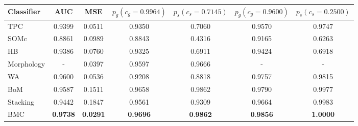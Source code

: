 \begin{tabular}{l c c c c c c}
  Classifier & AUC & MSE &
  $p_{g}\left(c_g=0.9964\right)$ & $p_{s}\left(c_s=0.7145\right)$ &
  $p_{g}\left(c_g=0.9600\right)$ & $p_{s}\left(c_s=0.2500\right)$ \\
  \hline
  TPC        & 0.9399 & 0.0511 & 0.9350 & 0.7060 & 0.9570 & 0.9747 \\
  SOMc       & 0.8861 & 0.0989 & 0.8843 & 0.4316 & 0.9165 & 0.6263 \\
  HB         & 0.9386 & 0.0760 & 0.9325 & 0.6911 & 0.9424 & 0.6918 \\
  Morphology & - & 0.0397 & 0.9597 & 0.9666 & - & - \\
  WA         & 0.9600 & 0.0536 & 0.9208 & 0.8818 & 0.9757 & 0.9815 \\
  BoM        & 0.9587 & 0.1511 & 0.9658 & 0.9862 & 0.9790 & 0.9977 \\
  Stacking   & 0.9442 & 0.1847 & 0.9561 & 0.9309 & 0.9664 & 0.9983 \\
  BMC        & \textbf{0.9738} & \textbf{0.0291} & \textbf{0.9696} & $\textbf{0.9862}$ & $\textbf{0.9856}$ & \textbf{1.0000} \\
\end{tabular}